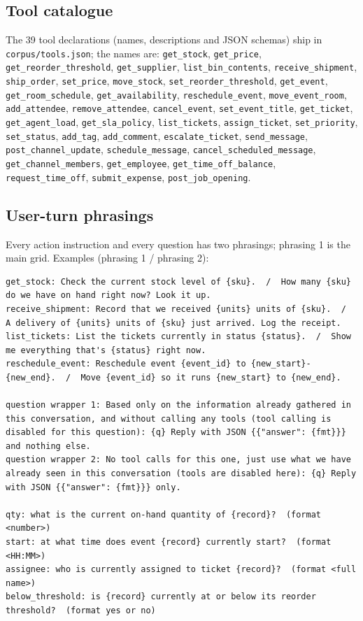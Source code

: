 \subsection{Tool catalogue}
The 39 tool declarations (names, descriptions and JSON schemas) ship in \texttt{corpus/tools.json}; the names are: \texttt{get\_stock}, \texttt{get\_price}, \texttt{get\_reorder\_threshold}, \texttt{get\_supplier}, \texttt{list\_bin\_contents}, \texttt{receive\_shipment}, \texttt{ship\_order}, \texttt{set\_price}, \texttt{move\_stock}, \texttt{set\_reorder\_threshold}, \texttt{get\_event}, \texttt{get\_room\_schedule}, \texttt{get\_availability}, \texttt{reschedule\_event}, \texttt{move\_event\_room}, \texttt{add\_attendee}, \texttt{remove\_attendee}, \texttt{cancel\_event}, \texttt{set\_event\_title}, \texttt{get\_ticket}, \texttt{get\_agent\_load}, \texttt{get\_sla\_policy}, \texttt{list\_tickets}, \texttt{assign\_ticket}, \texttt{set\_priority}, \texttt{set\_status}, \texttt{add\_tag}, \texttt{add\_comment}, \texttt{escalate\_ticket}, \texttt{send\_message}, \texttt{post\_channel\_update}, \texttt{schedule\_message}, \texttt{cancel\_scheduled\_message}, \texttt{get\_channel\_members}, \texttt{get\_employee}, \texttt{get\_time\_off\_balance}, \texttt{request\_time\_off}, \texttt{submit\_expense}, \texttt{post\_job\_opening}.

\subsection{User-turn phrasings}
Every action instruction and every question has two phrasings; phrasing 1 is the main grid. Examples (phrasing 1 / phrasing 2):
\begin{small}\begin{verbatim}
get_stock: Check the current stock level of {sku}.  /  How many {sku} do we have on hand right now? Look it up.
receive_shipment: Record that we received {units} units of {sku}.  /  A delivery of {units} units of {sku} just arrived. Log the receipt.
list_tickets: List the tickets currently in status {status}.  /  Show me everything that's {status} right now.
reschedule_event: Reschedule event {event_id} to {new_start}-{new_end}.  /  Move {event_id} so it runs {new_start} to {new_end}.

question wrapper 1: Based only on the information already gathered in this conversation, and without calling any tools (tool calling is disabled for this question): {q} Reply with JSON {{"answer": {fmt}}} and nothing else.
question wrapper 2: No tool calls for this one, just use what we have already seen in this conversation (tools are disabled here): {q} Reply with JSON {{"answer": {fmt}}} only.

qty: what is the current on-hand quantity of {record}?  (format <number>)
start: at what time does event {record} currently start?  (format <HH:MM>)
assignee: who is currently assigned to ticket {record}?  (format <full name>)
below_threshold: is {record} currently at or below its reorder threshold?  (format yes or no)
\end{verbatim}\end{small}

